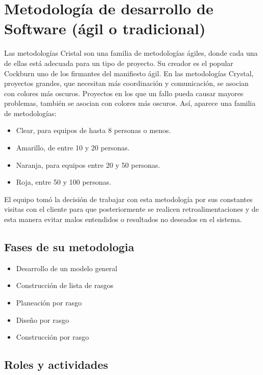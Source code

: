 \section{Metodología de desarrollo de Software (ágil o tradicional)}
Las metodologías Cristal son una familia de metodologías ágiles, donde cada una de ellas está adecuada para un tipo de proyecto. Su creador es el popular Cockburn uno de los firmantes del manifiesto ágil.
En las metodologías Crystal, proyectos grandes, que necesitan más coordinación y comunicación, se asocian con colores más oscuros. Proyectos en los que un fallo pueda causar mayores problemas, también se asocian con colores más oscuros.
Así, aparece una familia de metodologías:
\begin{itemize}

\item Clear, para equipos de hasta 8 personas o menos.

\item Amarillo, de entre 10 y 20 personas.

\item Naranja, para equipos entre 20 y 50 personas.

\item Roja, entre 50 y 100 personas.

\end{itemize}

El equipo tomó la decisión de trabajar con esta metodología por sus constantes visitas con el cliente para que posteriormente se realicen retroalimentaciones y de esta manera evitar malos entendidos o resultados no deseados en el sistema.


\subsection{Fases de su metodologia}
\begin{itemize}
\item Desarrollo de un modelo general
\item Construcción de lista de rasgos
\item Planeación por rasgo
\item Diseño por rasgo
\item Construcción por rasgo
\end{itemize}



\subsection{Roles y actividades}


